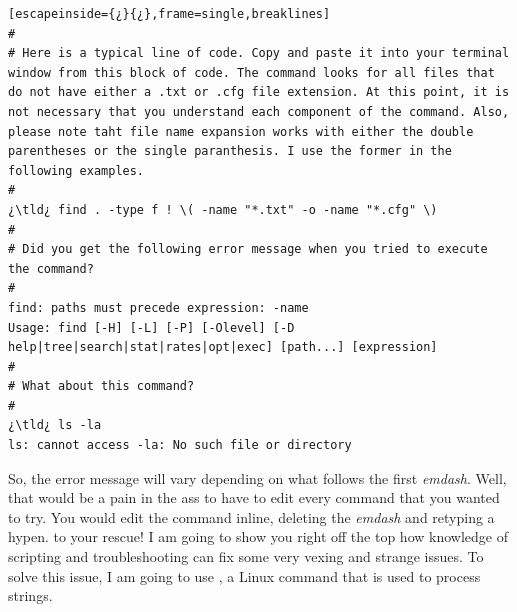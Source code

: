 \begin{lstlisting}[escapeinside={¿}{¿},frame=single,breaklines]
#
# Here is a typical line of code. Copy and paste it into your terminal window from this block of code. The command looks for all files that do not have either a .txt or .cfg file extension. At this point, it is not necessary that you understand each component of the command. Also, please note taht file name expansion works with either the double parentheses or the single paranthesis. I use the former in the following examples.
#
¿\tld¿ find . -type f ! \( -name "*.txt" -o -name "*.cfg" \)
#
# Did you get the following error message when you tried to execute the command?
#
find: paths must precede expression: -name
Usage: find [-H] [-L] [-P] [-Olevel] [-D help|tree|search|stat|rates|opt|exec] [path...] [expression]
#
# What about this command?
#
¿\tld¿ ls -la
ls: cannot access -la: No such file or directory
\end{lstlisting}

So, the error message will vary depending on what follows the first \emph{emdash}. Well, that would be a pain in the ass to have to edit every command that you wanted to try. You would edit the command inline, deleting the \emph{emdash} and retyping a hypen.  to your rescue! I am going to show you right off the top how knowledge of scripting and troubleshooting can fix some very vexing and strange issues. To solve this issue, I am going to use , a Linux command that is used to process strings.

